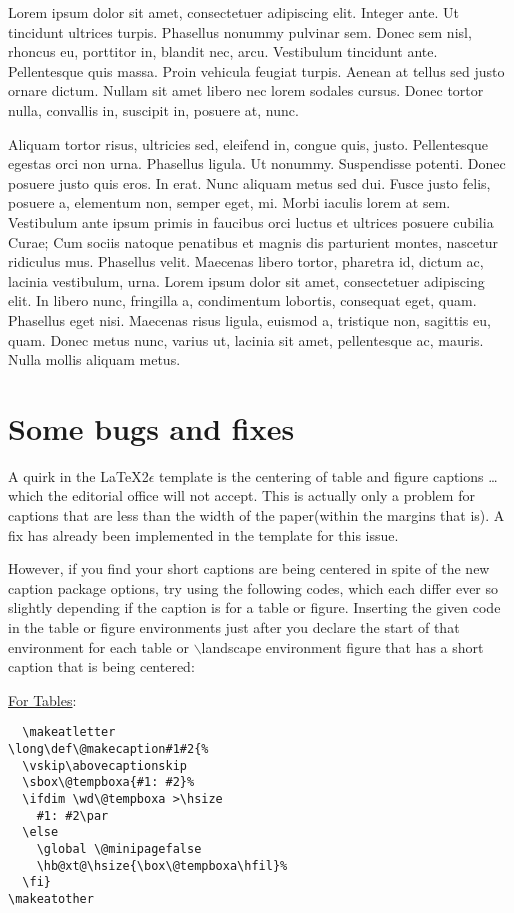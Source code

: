 {Lorem ipsum dolor sit amet, consectetuer adipiscing elit. Integer
ante. Ut tincidunt ultrices turpis. Phasellus nonummy pulvinar sem.
Donec sem nisl, rhoncus eu, porttitor in, blandit nec, arcu.
Vestibulum tincidunt ante. Pellentesque quis massa. Proin vehicula
feugiat turpis. Aenean at tellus sed justo ornare dictum. Nullam sit
amet libero nec lorem sodales cursus. Donec tortor nulla, convallis
in, suscipit in, posuere at, nunc.

Aliquam tortor risus, ultricies sed, eleifend in, congue quis,
justo. Pellentesque egestas orci non urna. Phasellus ligula. Ut
nonummy. Suspendisse potenti. Donec posuere justo quis eros. In
erat. Nunc aliquam metus sed dui. Fusce justo felis, posuere a,
elementum non, semper eget, mi. Morbi iaculis lorem at sem.
Vestibulum ante ipsum primis in faucibus orci luctus et ultrices
posuere cubilia Curae; Cum sociis natoque penatibus et magnis dis
parturient montes, nascetur ridiculus mus. Phasellus velit. Maecenas
libero tortor, pharetra id, dictum ac, lacinia vestibulum, urna.
Lorem ipsum dolor sit amet, consectetuer adipiscing elit. In libero
nunc, fringilla a, condimentum lobortis, consequat eget, quam.
Phasellus eget nisi. Maecenas risus ligula, euismod a, tristique
non, sagittis eu, quam. Donec metus nunc, varius ut, lacinia sit
amet, pellentesque ac, mauris. Nulla mollis aliquam metus.


\section{Some bugs and fixes}

A quirk in the \LaTeX 2\ensuremath{\epsilon} template is
the centering of table and figure captions \ldots which the editorial
office will not accept. This is actually only a problem for captions
that are less than the width of the paper(within the margins that
is). A fix has already been implemented in the template for this issue.

However, if you find your short captions are
being centered in spite of the new caption package options, try
using the following codes, which each differ ever so slightly
depending if the caption is for a table or figure. Inserting the
given code in the table or figure environments just after you
declare the start of that environment for each table or $\backslash$landscape environment figure that
has a short caption that is being centered:

\singlespacing%
\noindent \underline{For Tables}:

\begin{verbatim}
  \makeatletter
\long\def\@makecaption#1#2{%
  \vskip\abovecaptionskip
  \sbox\@tempboxa{#1: #2}%
  \ifdim \wd\@tempboxa >\hsize
    #1: #2\par
  \else
    \global \@minipagefalse
    \hb@xt@\hsize{\box\@tempboxa\hfil}%
  \fi}
\makeatother
\end{verbatim}

}
